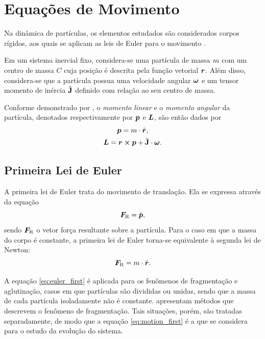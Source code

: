 \section{Equações de Movimento} \label{sec:equations_of_motion}

Na dinâmica de partículas, os elementos estudados são considerados corpos rígidos, aos quais se aplicam as leis de Euler para o movimento \cite{bib:sampaio, bib:dynamics_of_multibody_systems}.

Em um sistema inercial fixo, considera-se uma partícula de massa \(m\) com um centro de massa \(C\) cuja posição é descrita pela função vetorial \(\bm{r}\). Além disso, considera-se que a partícula possua uma velocidade angular \(\bm{\omega}\) e um tensor momento de inércia \(\hat{\mathbf{J}}\) definido com relação ao seu centro de massa.

Conforme demonstrado por , o \textit{momento linear} e o \textit{momento angular} da partícula, denotados respectivamente por \(\bm{p}\) e \(\bm{L}\), são então dados por
\begin{gather*}
	\linearMomentum = \mass\cdot\velocity, \\
	\angularMomentum = \position\cross\linearMomentum + \tensorOfInertia\cdot\angularVelocity.
\end{gather*}

\subsection{Primeira Lei de Euler}

A primeira lei de Euler trata do movimento de translação. Ela se expressa através da equação
\begin{equation} \label{eq:euler_first}
	\resultingForce = \deriv{1}{\linearMomentum},
\end{equation}
sendo \(\bm{F}_{\text{R}}\) o vetor força resultante sobre a partícula. Para o caso em que a massa do corpo é constante, a primeira lei de Euler torna-se equivalente à segunda lei de Newton:
\begin{equation} \label{eq:motion_first}
	\resultingForce = \mass\cdot\acceleration.
\end{equation}

A equação \eqref{eq:euler_first} é aplicada para os fenômenos de fragmentação e aglutinação, casos em que partículas são divididas ou unidas, sendo que a massa de cada partícula isoladamente não é constante.  apresentam métodos que descrevem o fenômeno de fragmentação. Tais situações, porém, são tratadas separadamente, de modo que a equação \eqref{eq:motion_first} é a que se considera para o estudo da evolução do sistema.

